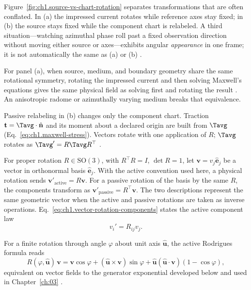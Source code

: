 Figure~\ref{fig:ch1.source-vs-chart-rotation} separates transformations that are often conflated. In (a) the impressed current rotates while reference axes stay fixed; in (b) the source stays fixed while the component chart is relabeled. A third situation---watching azimuthal phase roll past a fixed observation direction without moving either source or axes---exhibits angular \emph{appearance} in one frame; it is not automatically the same as (a) or (b) \cite{hansen1988}.

For panel (a), when source, medium, and boundary geometry share the same rotational symmetry, rotating the impressed current and then solving Maxwell's equations gives the same physical field as solving first and rotating the result \cite{stratton1941,hansen1988}. An anisotropic radome or azimuthally varying medium breaks that equivalence.

Passive relabeling in (b) changes only the component chart. Traction $\mathbf{t}=\Tavg\cdot\hat{\mathbf{n}}$ and its moment about a declared origin are built from $\Tavg$ (Eq.~\eqref{eq:ch1.maxwell-stress}). Vectors rotate with one application of $R$; $\Tavg$ rotates as $\Tavg'=R\Tavg R^\top$ \cite{beth1936,stratton1941}.

For proper rotation \(R\in\mathrm{SO}(3)\), with \(R^\top R=I\), \(\det R=1\), let
\(\mathbf{v}=v_j\hat{\mathbf{e}}_j\) be a vector in orthonormal basis
\(\hat{\mathbf{e}}_j\). With the active convention used here, a physical rotation sends $\mathbf{v}'_{\mathrm{active}}=R\mathbf{v}$. For a passive rotation of the basis by the same $R$, the components transform as $\mathbf{v}'_{\mathrm{passive}}=R^\top\mathbf{v}$. The two descriptions represent the same geometric vector when the active and passive rotations are taken as inverse operations. Eq.~\eqref{eq:ch1.vector-rotation-components} states the active component law
\begin{equation}
\label{eq:ch1.infinitesimal-active-rotation}v_i' = R_{ij}v_j.
\end{equation}
\addtocounter{equation}{-1}\label{eq:ch1.vector-rotation-components}%
\addtocounter{equation}{-1}\label{eq:ch1.active-rotation-action}%
For a finite rotation through angle \(\varphi\) about unit axis \(\hat{\mathbf{u}}\), the active Rodrigues formula reads
\begin{equation}
\label{eq:ch1.rodrigues-rotation}
R(\varphi,\hat{\mathbf{u}})\,\mathbf{v}
=
\mathbf{v}\cos\varphi
+(\hat{\mathbf{u}}\times\mathbf{v})\sin\varphi
+\hat{\mathbf{u}}(\hat{\mathbf{u}}\cdot\mathbf{v})(1-\cos\varphi),
\end{equation}
equivalent on vector fields to the generator exponential developed below and used in Chapter~\ref{ch:03} \cite{jackson1999,stratton1941}.


